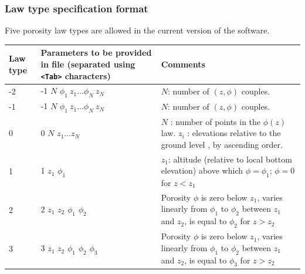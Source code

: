 \subsubsection{Law type specification format}
Five porosity law types are allowed in the current version of the software.\\

\begin{tabular}{p{1.5cm} | p{5.5cm} | p{8cm}} 
\hline
Law type & Parameters to be provided in file (separated using \texttt{<Tab>} characters) & Comments \\
\hline
\hline
-2 & -1 $N$ $\phi_1 \: z_1  \ldots \phi_N \: z_N$ &  $N$: number of $(z,\phi)$ couples. \\
\hline
-1 & -1 $N$ $\phi_1 \: z_1  \ldots \phi_N \: z_N$ &  $N$: number of $(z,\phi)$ couples. \\
\hline
0 & 0 $N$ $z_1 \ldots z_N$ & $N$ : number of points in the $\phi(z)$ law. $z_i$ : elevations relative to the ground level , by ascending order. \\
\hline
 1 & 1 $z_1$ $\phi_1$ & $z_1$: altitude (relative to local bottom elevation) above which $\phi=\phi_1$; $\phi = 0$ for $z < z_1$ \\
 \hline
 2 & 2 $z_1$ $z_2$ $\phi_1$ $\phi_2$ & Porosity $\phi$ is zero below $z_1$, varies linearly from $\phi_1$ to $\phi_2$ between $z_1$ and $z_2$, is equal to $\phi_2$ for $z > z_2$  \\
 \hline
 3 & 3 $z_1$ $z_2$ $\phi_1$ $\phi_2$ $\phi_3$ & Porosity $\phi$ is zero below $z_1$, varies linearly from $\phi_1$ to $\phi_2$ between $z_1$ and $z_2$, is equal to $\phi_3$ for $z > z_2$ \\
\hline
\end{tabular}
%
